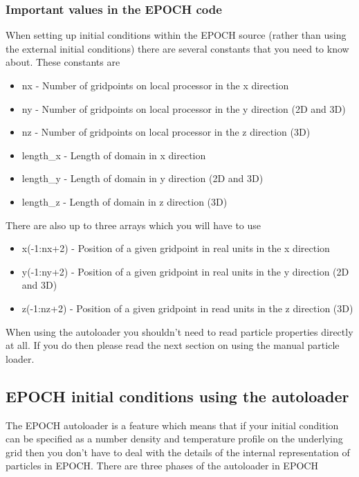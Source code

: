 \documentclass[12pt]{article}
\begin{document}
\subsubsection{Important values in the EPOCH code}
When setting up initial conditions within the EPOCH source (rather than using the external initial conditions) there are several constants that you need to know about. These constants are
\begin{itemize}
\item nx - Number of gridpoints on local processor in the x direction
\item ny - Number of gridpoints on local processor in the y direction (2D and 3D)
\item nz - Number of gridpoints on local processor in the z direction (3D)
\item length\_x - Length of domain in x direction
\item length\_y - Length of domain in y direction (2D and 3D)
\item length\_z - Length of domain in z direction (3D)
\end{itemize}
There are also up to three arrays which you will have to use
\begin{itemize}
\item x(-1:nx+2) - Position of a given gridpoint in real units in the x direction
\item y(-1:ny+2) - Position of a given gridpoint in real units in the y direction (2D and 3D)
\item z(-1:nz+2) - Position of a given gridpoint in read units in the z direction (3D)
\end{itemize}
When using the autoloader you shouldn't need to read particle properties directly at all. If you do then please read the next section on using the manual particle loader.
\subsection{EPOCH initial conditions using the autoloader}
The EPOCH autoloader is a feature which means that if your initial condition can be specified as a number density and temperature profile on the underlying grid then you don't have to deal with the details of the internal representation of particles in EPOCH. There are three phases of the autoloader in EPOCH
\end{document}
